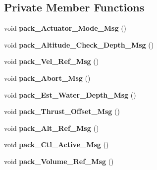 \subsection*{Private Member Functions}
\begin{DoxyCompactItemize}
\item 
\mbox{\label{classCOMMAND__reader_ae13f00952dbe6811048be090ceb9879a}} 
void {\bfseries pack\+\_\+\+Actuator\+\_\+\+Mode\+\_\+\+Msg} ()
\item 
\mbox{\label{classCOMMAND__reader_a685d1fba02464e8a08761f9c0da5f08e}} 
void {\bfseries pack\+\_\+\+Altitude\+\_\+\+Check\+\_\+\+Depth\+\_\+\+Msg} ()
\item 
\mbox{\label{classCOMMAND__reader_aecefb5b993d43831d1f50b33690f539e}} 
void {\bfseries pack\+\_\+\+Vel\+\_\+\+Ref\+\_\+\+Msg} ()
\item 
\mbox{\label{classCOMMAND__reader_a41f260c4b779dda290f862ad2efa993d}} 
void {\bfseries pack\+\_\+\+Abort\+\_\+\+Msg} ()
\item 
\mbox{\label{classCOMMAND__reader_ada5b52a230145bdd2d3ee9e9ed9570d6}} 
void {\bfseries pack\+\_\+\+Est\+\_\+\+Water\+\_\+\+Depth\+\_\+\+Msg} ()
\item 
\mbox{\label{classCOMMAND__reader_a6479d37c36364b77c5d6adf2a5edcde0}} 
void {\bfseries pack\+\_\+\+Thrust\+\_\+\+Offset\+\_\+\+Msg} ()
\item 
\mbox{\label{classCOMMAND__reader_a87f2f4216c7e28ff35e607f68988edd6}} 
void {\bfseries pack\+\_\+\+Alt\+\_\+\+Ref\+\_\+\+Msg} ()
\item 
\mbox{\label{classCOMMAND__reader_a75e1b4110fd01aea6da837dba7fbf680}} 
void {\bfseries pack\+\_\+\+Ctl\+\_\+\+Active\+\_\+\+Msg} ()
\item 
\mbox{\label{classCOMMAND__reader_a23b4fb4512cf9a15370e9a019b7b338f}} 
void {\bfseries pack\+\_\+\+Volume\+\_\+\+Ref\+\_\+\+Msg} ()
\item 
\mbox{\label{classCOMMAND__reader_af2c35117092d32e5a6404ebe45559178}} 

\end{DoxyCompactItemize}
